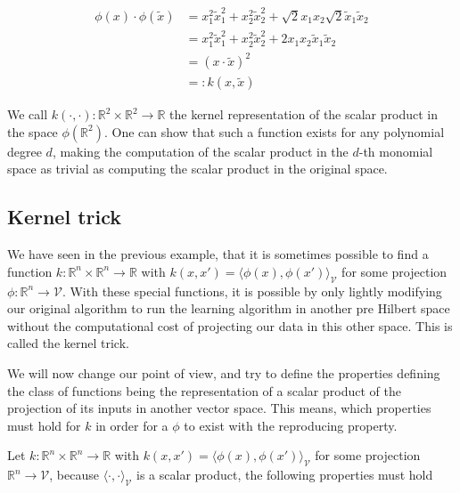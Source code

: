 \begin{equation*}
  \begin{aligned}
    \phi(x) \cdot \phi(\tilde{x})
    &= x_1^2\tilde{x}_1^2 + x_2^2\tilde{x}_2^2 + \sqrt{2}x_1x_2\sqrt{2}\tilde{x}_1\tilde{x}_2\\
    &= x_1^2\tilde{x}_1^2 + x_2^2\tilde{x}_2^2 + 2x_1x_2\tilde{x}_1\tilde{x}_2\\
    &= \left(x \cdot \tilde{x}\right)^2 \\
    &=: k(x, \tilde{x})
  \end{aligned}
\end{equation*}

We call $k(\cdot, \cdot) : \mathbb{R}^2 \times \mathbb{R}^2 \rightarrow \mathbb{R}$ the kernel representation of the scalar product in the space $\phi(\mathbb{R}^2)$. One can show that such a function exists for any polynomial degree $d$, making the computation of the scalar product in the $d$-th monomial space as trivial as computing the scalar product in the original space.

\subsection{Kernel trick}

We have seen in the previous example, that it is sometimes possible to find a function $k :\mathbb{R}^n \times \mathbb{R}^n \rightarrow \mathbb{R}$ with $k(x, x') = \langle \phi(x), \phi(x')\rangle _{\mathcal{V}}$ for some projection $\phi : \mathbb{R}^n \rightarrow \mathcal{V}$. With these special functions, it is possible by only lightly modifying our original algorithm to run the learning algorithm in another pre Hilbert space without the computational cost of projecting our data in this other space. This is called the kernel trick.

We will now change our point of view, and try to define the properties defining the class of functions being the representation of a scalar product of the projection of its inputs in another vector space. This means, which properties must hold for $k$ in order for a $\phi$ to exist with the reproducing property.

Let $k :\mathbb{R}^n \times \mathbb{R}^n \rightarrow \mathbb{R}$ with $k(x, x') = \langle \phi(x), \phi(x')\rangle _{\mathcal{V}}$ for some projection $\mathbb{R}^n \rightarrow \mathcal{V}$, because $\langle \cdot, \cdot\rangle _{\mathcal{V}}$ is a scalar product, the following properties must hold

